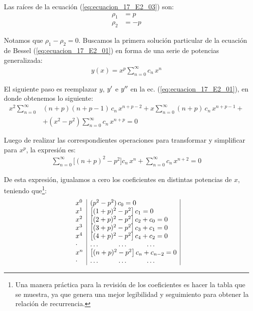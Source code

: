 Las raíces de la ecuación (\ref{eq:ecuacion_17_E2_03}) son:
\begin{align}
\rho_{1} &= p \\[0.5em]
\rho_{2} &= -p
\label{eq:ecuacion_17_E2_04}
\end{align}

Notamos que $\rho_{1} - \rho_{2} = 0$. Buscamos la primera solución particular de la ecuación de Bessel (\ref{eq:ecuacion_17_E2_01}) en forma de una serie de potencias generalizada:
\begin{align}
y(x) = x^{p} \sum_{n=0}^{\infty} c_{n} \, x^{n}
\label{eq:ecuacion_17_E2_05}
\end{align}

El siguiente paso es reemplazar $y$, ${y}^{\prime}$ e ${y}^{\prime \prime}$ en la ec. (\ref{eq:ecuacion_17_E2_01}), en donde obtenemos lo siguiente:
\begin{align*}
x^{2} \sum_{n=0}^{\infty} &(n + p)(n + p - 1) \, c_{n} \, x^{n+p-2} + x \sum_{n=0}^{\infty} (n + p) \, c_{n} \, x^{n+p-1} + \\[1em]
&+ (x^{2} - p^{2}) \sum_{n=0}^{\infty} c_{n} \, x^{n+p} = 0
\end{align*}

Luego de realizar las correspondientes operaciones para transformar y simplificar para $x^{p}$, la expresión es:
\begin{align}
\sum_{n=0}^{\infty} \bigg[ (n + p)^{2} - p^{2} \bigg] c_{n} \, x^{n} + \sum_{n=0}^{\infty} c_{n} \, x^{n+2} = 0
\label{eq:ecuacion_17_E2_06}
\end{align}

De esta expresión, igualamos a cero los coeficientes en distintas potencias de $x$, teniendo que\footnote{Una manera práctica para la revisión de los coeficientes es hacer la tabla que se muestra, ya que genera una mejor legibilidad y seguimiento para obtener la relación de recurrencia.}:
\begin{equation}
\begin{array}{l | l |}
x^{0} & (p^{2} - p^{2}) \, c_{0} = 0 \\
x^{1} & \big[(1 + p)^{2} - p^{2} \big] \, c_{1} = 0 \\
x^{2} & \big[(2 + p)^{2} - p^{2} \big] \, c_{2} + c_{0} = 0 \\
x^{3} & \big[(3 + p)^{2} - p^{2} \big] \, c_{3} + c_{1} = 0 \\
x^{4} & \big[(4 + p)^{2} - p^{2} \big] \, c_{4} + c_{2} = 0 \\
\cdot & \ldots \hspace{1cm} \ldots \hspace{1cm} \ldots \\
x^{n} & \big[(n + p)^{2} - p^{2} \big] \, c_{n} + c_{n-2} = 0 \\
\cdot & \ldots \hspace{1cm} \ldots \hspace{1cm} \ldots \\
\end{array}
\label{eq:ecuacion_17_E2_07}
\end{equation}

